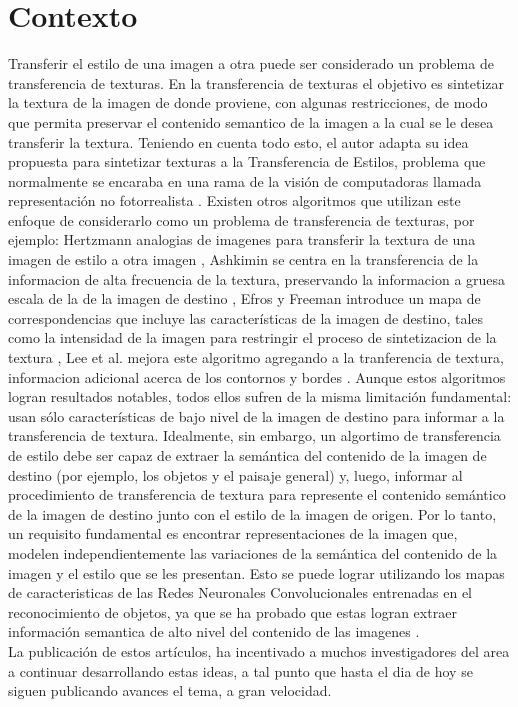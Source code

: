 \documentclass[a4paper,11pt,spanish]{book}
\begin{document}
    \section{Contexto}
      Transferir el estilo de una imagen a otra puede ser considerado un problema de transferencia de texturas. En la transferencia de texturas el objetivo es sintetizar la textura de la imagen
      de donde proviene, con algunas restricciones, de modo que permita preservar el contenido semantico de la imagen a la cual se le desea transferir la textura.
      Teniendo en cuenta todo esto, el autor adapta su idea propuesta para sintetizar texturas a la Transferencia de Estilos, problema que normalmente se encaraba en una rama de la visión de computadoras llamada representación
      no fotorrealista \cite{Kyprianidis:ArtisticStylization}. 
      Existen otros algoritmos que utilizan este enfoque de considerarlo como un problema de transferencia de texturas, por ejemplo: Hertzmann analogias de imagenes para transferir la 
      textura de una imagen de estilo a otra imagen \cite{Hertzmann:ImageAnalogies}, Ashkimin se centra en la transferencia de la informacion de alta frecuencia de la textura, 
      preservando la informacion a gruesa escala de la de la imagen de destino \cite{Ashikhmin:FastTextureTransfer}, Efros y Freeman introduce un mapa de correspondencias
      que incluye las características de la imagen de destino, tales como la intensidad de la imagen para restringir el proceso de sintetizacion de la textura \cite{Efros:ImageQuilting}, 
      Lee et al. mejora este algoritmo agregando a la tranferencia de textura, informacion adicional acerca de los contornos y bordes \cite{Lee:DirectionalTextureTransfer}.
      Aunque estos algoritmos logran resultados notables, todos ellos sufren de la misma limitación fundamental: usan sólo características de bajo nivel de la imagen de destino para 
      informar a la transferencia de textura. Idealmente, sin embargo, un algortimo de transferencia de estilo debe ser capaz de extraer la semántica del contenido de la imagen de 
      destino (por ejemplo, los objetos y el paisaje general) y, luego, informar al procedimiento de transferencia de textura para represente el contenido semántico de la imagen de destino 
      junto con el estilo de la imagen de origen. Por lo tanto, un requisito fundamental es encontrar representaciones de la imagen que, modelen independientemente las variaciones 
      de la semántica del contenido de la imagen y el estilo que se les presentan. Esto se puede lograr utilizando los mapas de caracteristicas de las Redes Neuronales Convolucionales 
      entrenadas en el reconocimiento de objetos, ya que se ha probado que estas logran extraer información semantica de alto nivel del contenido de las imagenes \cite{AlexNet}. \\
      La publicación de estos artículos, ha incentivado a muchos investigadores del area a continuar desarrollando estas ideas, a tal punto que hasta el dia de hoy se siguen publicando
      avances el tema, a gran velocidad.
\end{document}
